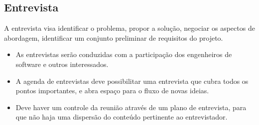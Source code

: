 \subsection {Entrevista}

A entrevista visa identificar o problema, propor a solução, negociar os aspectos de abordagem, identificar um conjunto preliminar  de requisitos do projeto.

\begin{itemize}
\item As entrevistas serão conduzidas com a participação dos engenheiros de software e outros interessados.
\item A agenda de entrevistas deve possibilitar uma entrevista que cubra todos os pontos importantes,  e abra espaço para o fluxo de novas ideias.
\item Deve haver  um controle da reunião através de um plano de entrevista, para que não haja uma dispersão do conteúdo pertinente ao entrevistador.
\end{itemize}
